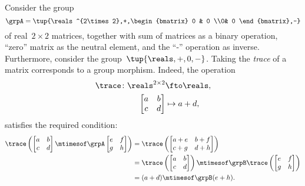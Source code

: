 \begin{example}
    Consider the group
    \begin{equation*}
        \grpA=\tup{\reals^{2\times 2},+,\begin{bmatrix}
                0 & 0 \\0& 0
            \end{bmatrix},-}
    \end{equation*}
    of real~$2\times 2$ matrices, together with sum of matrices as a binary operation, ``zero'' matrix as the neutral element, and the ``-'' operation as inverse.
    Furthermore, consider the group~$\tup{\reals,+,0,-}$.
    Taking the \emph{trace} of a matrix corresponds to a group morphism.
    Indeed, the operation
    \begin{equation*}
        \begin{aligned}
            \trace\colon \reals^{2\times 2} & \fto \reals, \\
            \begin{bmatrix}
                a & b \\
                c & d
            \end{bmatrix}                 & \mapsto a+d,
        \end{aligned}
    \end{equation*}
    satisfies the required condition:
    \begin{equation*}
        \begin{aligned}
            \trace \left(
            \begin{bmatrix}
                a & b \\
                c & d
            \end{bmatrix} \mtimesof\grpA
            \begin{bmatrix}
                e & f \\
                g & h
            \end{bmatrix}
            \right) & =
            \trace
            \left(
            \begin{bmatrix}
                a+e & b+f \\
                c+g & d+h
            \end{bmatrix}
            \right) \\
                    & =\trace \left(
            \begin{bmatrix}
                a & b \\
                c & d
            \end{bmatrix}\right)\mtimesof\grpB \trace \left(
            \begin{bmatrix}
                e & f \\
                g & h
            \end{bmatrix}
            \right) \\
                    & =(a+d)\mtimesof\grpB (e+h).
        \end{aligned}
    \end{equation*}
\end{example}

